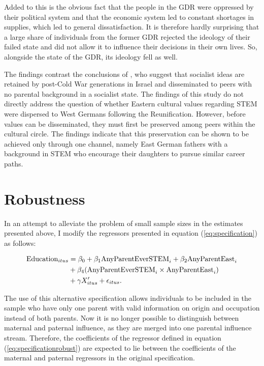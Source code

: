 \documentclass[a4paper, oneside, hyperfootnotes = false]{article}
\begin{document}
{Added to this is the obvious fact that the people in the GDR were oppressed by their political system and that the economic system led to constant shortages in supplies, which led to general dissatisfaction.
It is therefore hardly surprising that a large share of individuals from the former GDR rejected the ideology of their failed state and did not allow it to influence their decisions in their own lives.
So, alongside the state of the GDR, its ideology fell as well.

The findings contrast the conclusions of \cite{FriedmanSokuler2020}, who suggest that socialist ideas are retained by post-Cold War generations in Israel and disseminated to peers with no parental background in a socialist state.
The findings of this study do not directly address the question of whether Eastern cultural values regarding STEM were dispersed to West Germans following the Reunification.
However, before values can be disseminated, they must first be preserved among peers within the cultural circle.
The findings indicate that this preservation can be shown to be achieved only through one channel, namely East German fathers with a background in STEM who encourage their daughters to pursue similar career paths.

\section{Robustness}
\label{robustness}

In an attempt to alleviate the problem of small sample sizes in the estimates presented above, I modify the regressors presented in equation (\ref{eq:specification}) as follows:

\vspace{-8mm}

\begin{equation}
	\begin{split}
		\label{eq:specificationrobust}
		\textnormal{Education}_{itus} &={} \beta_{0} + \beta_{1}\textnormal{AnyParentEverSTEM}_{i} + \beta_{2}\textnormal{AnyParentEast}_{i} \\
		& + \beta_{4}(\textnormal{AnyParentEverSTEM}_{i} \times \textnormal{AnyParentEast}_{i}) \\
		& + \gamma{}X'_{itus} + \epsilon_{itus}\textnormal{.}
	\end{split}
\end{equation}

\noindent The use of this alternative specification allows individuals to be included in the sample who have only one parent with valid information on origin and occupation instead of both parents.
Now it is no longer possible to distinguish between maternal and paternal influence, as they are merged into one parental influence stream.
Therefore, the coefficients of the regressor defined in equation (\ref{eq:specificationrobust}) are expected to lie between the coefficients of the maternal and paternal regressors in the original specification.

}
\end{document}

